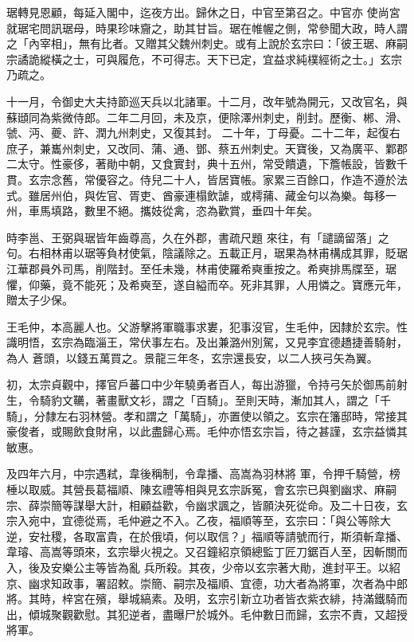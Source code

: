 \begin{pinyinscope}
 琚轉見恩顧，每延入閣中，迄夜方出。歸休之日，中官至第召之。中官亦
 使尚宮就琚宅問訊琚母，時果珍味齎之，助其甘旨。琚在帷幄之側，常參聞大政，時人謂之「內宰相」，無有比者。又贈其父魏州刺史。或有上說於玄宗曰：「彼王琚、麻嗣宗譎詭縱橫之士，可與履危，不可得志。天下已定，宜益求純樸經術之士。」玄宗乃疏之。



 十一月，令御史大夫持節巡天兵以北諸軍。十二月，改年號為開元，又改官名，與蘇頲同為紫微侍郎。二年二月回，未及京，便除澤州刺史，削封。歷衡、郴、滑、虢、沔、夔、許、潤九州刺史，又復其封。
 二十年，丁母憂。二十二年，起復右庶子，兼巂州刺史，又改同、蒲、通、鄧、蔡五州刺史。天寶後，又為廣平、鄴郡二太守。性豪侈，著勛中朝，又食實封，典十五州，常受饋遺，下簷帳設，皆數千貫。玄宗念舊，常優容之。侍兒二十人，皆居寶帳。家累三百餘口，作造不遵於法式。雖居州伯，與佐官、胥吏、酋豪連榻飲謔，或樗蒱、藏金句以為樂。每移一州，車馬填路，數里不絕。攜妓從禽，恣為歡賞，垂四十年矣。



 時李邕、王弼與琚皆年齒尊高，久在外郡，書疏尺題
 來往，有「譴謫留落」之句。右相林甫以琚等負材使氣，陰議除之。五載正月，琚果為林甫構成其罪，貶琚江華郡員外司馬，削階封。至任未幾，林甫使羅希奭重按之。希奭排馬牒至，琚懼，仰藥，竟不能死；及希奭至，遂自縊而卒。死非其罪，人用憐之。寶應元年，贈太子少保。



 王毛仲，本高麗人也。父游擊將軍職事求婁，犯事沒官，生毛仲，因隸於玄宗。性識明悟，玄宗為臨淄王，常伏事左右。及出兼潞州別駕，又見李宜德趫捷善騎射，為人
 蒼頭，以錢五萬買之。景龍三年冬，玄宗還長安，以二人挾弓矢為翼。



 初，太宗貞觀中，擇官戶蕃口中少年驍勇者百人，每出游獵，令持弓矢於御馬前射生，令騎豹文韉，著畫獸文衫，謂之「百騎」。至則天時，漸加其人，謂之「千騎」，分隸左右羽林營。孝和謂之「萬騎」，亦置使以領之。玄宗在籓邸時，常接其豪俊者，或賜飲食財帛，以此盡歸心焉。毛仲亦悟玄宗旨，待之甚謹，玄宗益憐其敏惠。



 及四年六月，中宗遇弒，韋後稱制，令韋播、高嵩為羽林將
 軍，令押千騎營，榜棰以取威。其營長葛福順、陳玄禮等相與見玄宗訴冤，會玄宗已與劉幽求、麻嗣宗、薛崇簡等謀舉大計，相顧益歡，令幽求諷之，皆願決死從命。及二十日夜，玄宗入宛中，宜德從焉，毛仲避之不入。乙夜，福順等至，玄宗曰：「與公等除大逆，安社稷，各取富貴，在於俄頃，何以取信？」福順等請號而行，斯須斬韋播、韋璿、高嵩等頭來，玄宗舉火視之。又召鐘紹京領總監丁匠刀鋸百人至，因斬關而入，後及安樂公主等皆為亂
 兵所殺。其夜，少帝以玄宗著大勛，進封平王。以紹京、幽求知政事，署詔敕。崇簡、嗣宗及福順、宜德，功大者為將軍，次者為中郎將。其時，梓宮在殯，舉城縞素。及明，玄宗引新立功者皆衣紫衣緋，持滿鐵騎而出，傾城聚觀歡慰。其犯逆者，盡曝尸於城外。毛仲數日而歸，玄宗不責，又超授將軍。




\end{pinyinscope}
